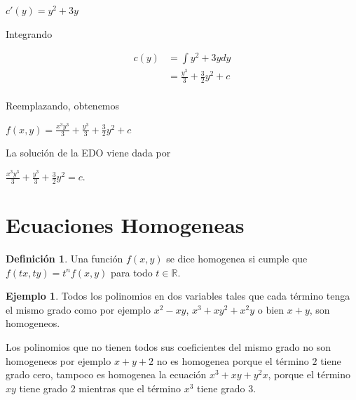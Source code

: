 \documentclass{article}
\theoremstyle{plain}
\theoremstyle{definition}
\newtheorem{defin}[thm]{Definición}
\newtheorem{ejem}[thm]{Ejemplo}
\begin{document}
\begin{center}
$ c'(y) =  y^2+3y$
\end{center}

Integrando



\begin{align*}
c(y) &=  \displaystyle \int y^2+3y dy \\
&=  \frac{y^3}{3} +\frac{3}{2}y^2 +c \\
\end{align*}

Reemplazando, obtenemos

\begin{center}
$\displaystyle f(x,y) =  \frac{x^3y^3}{3} +  \frac{y^3}{3} +\frac{3}{2}y^2 +c $
\end{center}

La solución de la EDO viene dada por

\begin{center}
$\displaystyle \frac{x^3y^3}{3} +  \frac{y^3}{3} +\frac{3}{2}y^2 =c $.
\end{center}

\newpage



\section{Ecuaciones Homogeneas}




\begin{defin}Una función $f(x,y)$ se dice homogenea si cumple que $f(tx,ty)=t^nf(x,y)$ para todo $t \in \mathbb{R}$. \\
\end{defin}

\begin{ejem}Todos los polinomios en dos variables tales que cada término tenga el mismo grado como por ejemplo $x^2-xy$, $x^3+xy^2 +x^2y$ o bien $x+y$, son homogeneos. \\
\end{ejem}

Los polinomios que no tienen todos sus coeficientes del mismo grado no son homogeneos por ejemplo $x+y+2$ no es homogenea porque el término $2$ tiene grado cero, tampoco es homogenea la ecuación $x^3 +xy +y^2x$, porque el término $xy$ tiene grado 2 mientras que el término $x^3$ tiene grado 3. \\
\end{document}
